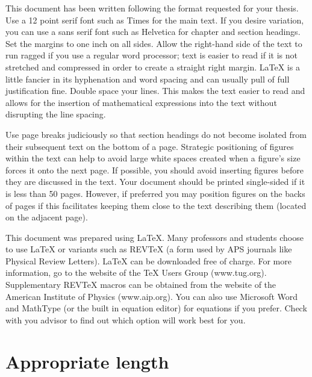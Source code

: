 This document has been written following the format requested for
your thesis. Use a 12 point serif font such as Times for the main
text. If you desire variation, you can use a sans serif font such
as Helvetica for chapter and section headings. Set the margins to
one inch on all sides. Allow the right-hand side of the text to run
ragged if you use a regular word processor; text is easier to read
if it is not stretched and compressed in order to create a straight
right margin. LaTeX is a little fancier in its hyphenation and word
spacing and can usually pull of full justification fine. Double
space your lines. This makes the text easier to read and allows for
the insertion of mathematical expressions into the text without
disrupting the line spacing.

Use page breaks judiciously so that section headings do not become
isolated from their subsequent text on the bottom of a page.
Strategic positioning of figures within the text can help to avoid
large white spaces created when a figure's size forces it onto the
next page. If possible, you should avoid inserting figures before
they are discussed in the text. Your document should be printed
single-sided if it is less than 50 pages. However, if preferred you
may position figures on the backs of pages if this facilitates
keeping them close to the text describing them (located on the
adjacent page).

This document was prepared using LaTeX.  Many professors and
students choose to use LaTeX or variants such as REVTeX (a form used
by APS journals like Physical Review Letters). LaTeX can be
downloaded free of charge. For more information, go to the website
of the TeX Users Group (www.tug.org). Supplementary REVTeX macros
can be obtained from the website of the American Institute of
Physics (www.aip.org). You can also use Microsoft Word and MathType
(or the built in equation editor) for equations if you prefer. Check
with you advisor to find out which option will work best for you.

\section{Appropriate length}
\label{sec:Length}

